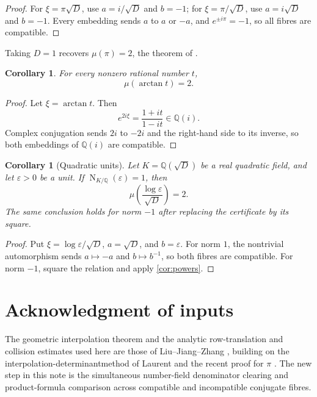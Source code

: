 \documentclass[11pt]{article}
\newcommand{\QQ}{\mathbb Q}
\DeclareMathOperator{\Nm}{N}
\newtheorem{corollary}[theorem]{Corollary}
\theoremstyle{definition}
\theoremstyle{remark}
\numberwithin{equation}{section}
\begin{document}
\begin{proof}
For $\xi=\pi\sqrt D$, use $a=i/\sqrt D$ and $b=-1$; for
$\xi=\pi/\sqrt D$, use $a=i\sqrt D$ and $b=-1$.  Every embedding sends
$a$ to $a$ or $-a$, and $e^{\pm i\pi}=-1$, so all fibres are compatible.
\end{proof}

Taking $D=1$ recovers $\mu(\pi)=2$, the theorem of
\cite{OpenAI2026}.

\begin{corollary}\label{cor:arctan}
For every nonzero rational number $t$,
\[
 \boxed{\mu(\arctan t)=2}.
\]
\end{corollary}

\begin{proof}
Let $\xi=\arctan t$.  Then
\[
 e^{2i\xi}=\frac{1+it}{1-it}\in\QQ(i).
\]
Complex conjugation sends $2i$ to $-2i$ and the right-hand side to its
inverse, so both embeddings of $\QQ(i)$ are compatible.
\end{proof}

\begin{corollary}[Quadratic units]\label{cor:quadratic-units}
Let $K=\QQ(\sqrt D)$ be a real quadratic field, and let
$\varepsilon>0$ be a unit.  If $\Nm_{K/\QQ}(\varepsilon)=1$, then
\[
 \mu\left(\frac{\log\varepsilon}{\sqrt D}\right)=2.
\]
The same conclusion holds for norm $-1$ after replacing the certificate
by its square.
\end{corollary}

\begin{proof}
Put $\xi=\log\varepsilon/\sqrt D$, $a=\sqrt D$, and $b=\varepsilon$.
For norm $1$, the nontrivial automorphism sends
$a\mapsto-a$ and $b\mapsto b^{-1}$, so both fibres are compatible.  For
norm $-1$, square the relation and apply \cref{cor:powers}.
\end{proof}

\section*{Acknowledgment of inputs}

The geometric interpolation theorem and the analytic row-translation
and collision estimates used here are those of Liu--Jiang--Zhang
\cite{LiuJiangZhang2026}, building on the interpolation-determinantmethod of Laurent \cite{Laurent1991,Laurent2000} and the recent proof for
$\pi$ \cite{OpenAI2026}.  The new step in this note is the simultaneous
number-field denominator clearing and product-formula comparison across
compatible and incompatible conjugate fibres.

\printbibliography
\end{document}
